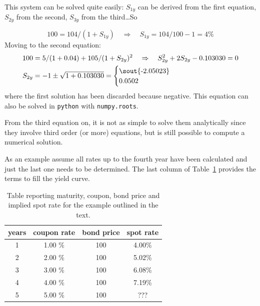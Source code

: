 This system can be solved quite easily: $S_{1y}$ can be derived from the first equation, $S_{2y}$ from the second, $S_{3y}$ from the third\ldots So

\begin{equation}
100 = 104 / (1 + S_{1y})\quad\Rightarrow\quad S_{1y} = 104/100 - 1 = 4\%
\end{equation}
Moving to the second equation:
\begin{equation}
\begin{split}
& 100 = 5 / (1 + 0.04) + 105 / (1 + S_{2y})^{2}\quad\Rightarrow\quad S_{2y}^2  + 2 S_{2y}  - 0.103030 = 0 \\
& S_{2y} = - 1 \pm \sqrt{1 + 0.103030} = \begin{cases}\text{\sout{-2.05023}} \\ 0.0502\end{cases}
\end{split}
\end{equation}
where the first solution has been discarded because negative. This equation can also be solved in \texttt{python} with \texttt{numpy.roots}.

From the third equation on, it is not as simple to solve them analytically since they involve third order (or more) equations, but is still possible to compute a numerical solution.

As an example assume all rates up to the fourth year have been calculated and just the last one needs to be determined. The last column of Table~\ref{tab:rates} provides the terms to fill the yield curve.

\begin{table}[htb]
\begin{center}
\begin{tabular}{|c|c|c|c|}
\hline
\textbf{years} & \textbf{coupon rate} & \textbf{bond price} & \textbf{spot rate} \\
\hline
1 & 1.00 \% & 100 & 4.00\% \\
\hline
2 & 2.00 \% & 100 & 5.02\% \\
\hline
3 & 3.00 \% & 100 & 6.08\% \\
\hline
4 & 4.00 \% & 100 & 7.19\% \\
\hline
5 & 5.00 \% & 100 & ??? \\
\hline
\end{tabular}
\end{center}
\caption{Table reporting maturity, coupon, bond price and implied spot rate for the example outlined in the text.}
\label{tab:rates}
\end{table}

